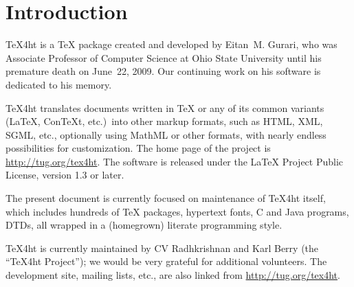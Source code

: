 % 

\chapter{Introduction}

\TeX{}4ht is a \TeX{} package created and developed by
Eitan~M. Gurari, who was Associate Professor of Computer Science
at Ohio State University until his premature death on June~22,
2009.  Our continuing work on his software is dedicated to his memory.

\TeX{}4ht translates documents written in \TeX{} or any of its common
variants (\LaTeX{}, Con\TeX{}t, etc.)\ into other markup formats, such
as HTML, XML, SGML, etc., optionally using MathML or other formats,
with nearly endless possibilities for customization.  The home page of
the project is \url{http://tug.org/tex4ht}.  The software is released
under the \LaTeX{} Project Public License, version 1.3 or later.

The present document is currently focused on maintenance of \TeX{}4ht
itself, which includes hundreds of \TeX{} packages, hypertext fonts, C
and Java programs, DTDs, all wrapped in a (homegrown) literate
programming style.

\TeX{}4ht is currently maintained by CV Radhkrishnan and Karl Berry
(the ``\TeX{}4ht Project''); we would be very grateful for additional
volunteers.  The development site, mailing lists, etc., are also
linked from \url{http://tug.org/tex4ht}.


